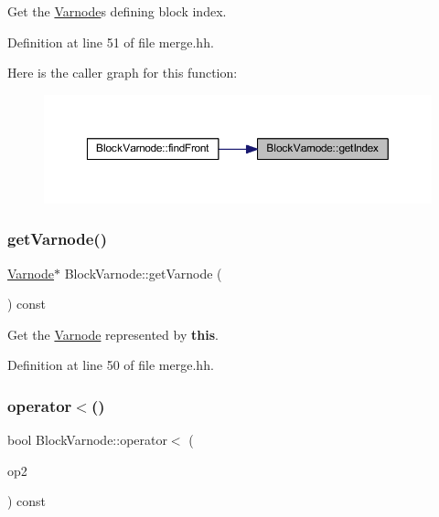 Get the \mbox{\hyperlink{class_varnode}{Varnode}}\textquotesingle{}s defining block index. 



Definition at line 51 of file merge.\+hh.

Here is the caller graph for this function\+:
\nopagebreak
\begin{figure}[H]
\begin{center}
\leavevmode
\includegraphics[width=350pt]{class_block_varnode_a51eeb35ed7db7fefa0cfd52ec9b719ac_icgraph}
\end{center}
\end{figure}
\mbox{\label{class_block_varnode_af6e07968e7891b7e7e75e92351de0ba1}} 
\subsubsection{\texorpdfstring{getVarnode()}{getVarnode()}}
{\footnotesize\ttfamily \mbox{\hyperlink{class_varnode}{Varnode}}$\ast$ Block\+Varnode\+::get\+Varnode (\begin{DoxyParamCaption}\item[{void}]{ }\end{DoxyParamCaption}) const\hspace{0.3cm}{\ttfamily [inline]}}



Get the \mbox{\hyperlink{class_varnode}{Varnode}} represented by {\bfseries{this}}. 



Definition at line 50 of file merge.\+hh.

\mbox{\label{class_block_varnode_a2946b402e8612fd8d690b85929b8fec6}} 
\subsubsection{\texorpdfstring{operator$<$()}{operator<()}}
{\footnotesize\ttfamily bool Block\+Varnode\+::operator$<$ (\begin{DoxyParamCaption}\item[{const \mbox{\hyperlink{class_block_varnode}{Block\+Varnode}} \&}]{op2 }\end{DoxyParamCaption}) const\hspace{0.3cm}{\ttfamily [inline]}}



